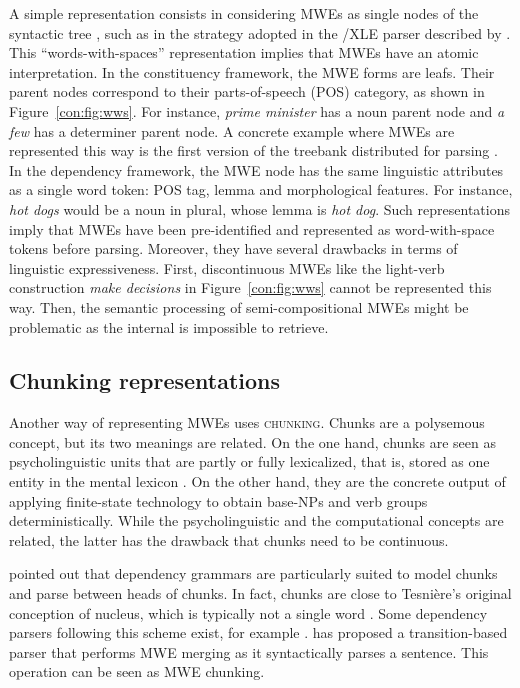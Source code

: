 \documentclass[output=paper]{langsci/langscibook}
\begin{document}
A simple representation consists in considering MWEs as single nodes of the syntactic tree \citep{sag02}, such as in the strategy adopted in the /XLE parser described by . This ``words-with-spaces'' representation implies that MWEs have an atomic interpretation. In the constituency framework, the MWE forms are leafs. Their parent nodes correspond to their parts-of-speech (POS) category, as shown in Figure~\ref{con:fig:wws}. For instance, \textit{prime minister} has a noun parent node and \textit{a few} has a determiner parent node. 
A concrete example where MWEs are represented this way is the first version of the  treebank distributed for parsing \citep{candito:2009}. 
In the dependency framework, the MWE node has the same linguistic attributes as a single word token: POS tag, lemma and morphological features. For instance, \textit{hot dogs} would be a noun in plural, whose lemma is \textit{hot dog}. Such representations imply that MWEs have been pre-identified and represented as word-with-space tokens before parsing. Moreover, they have several drawbacks in terms of linguistic expressiveness. First, discontinuous MWEs like the light-verb construction \textit{make decisions} in Figure~\ref{con:fig:wws} cannot be represented this way. Then, the semantic processing of semi-compositional MWEs might be problematic as the internal  is impossible to retrieve.%

\subsection {Chunking representations}
\label{con:ssec:chunking}

Another way of representing MWEs uses \textsc{chunking}. 
Chunks are a polysemous concept, but its two meanings are related. 
On the one hand, chunks are seen as psycholinguistic units that are partly or fully lexicalized, that is, stored as one entity in the mental lexicon \citep{miller56,pawley-syder83,tomasello98,wray08}. 
On the other hand, they are 
the concrete output of applying finite-state technology to obtain base-NPs and verb groups deterministically. While the psycholinguistic and the computational concepts are related, the latter has the drawback that chunks need to be continuous.

\citet{abney1991procedure} pointed out that dependency grammars are particularly suit\-ed to model chunks and parse between heads of chunks. 
In fact, chunks are close to Tesnière's original conception of nucleus, which is typically not a single word \citep{tesniere:1959}. Some dependency parsers following this scheme exist, for example \citet{schneiderphd}. \citet{nivre:2014} has proposed a transition-based parser that performs MWE merging as it syntactically parses a sentence. This operation can be seen as MWE chunking. 
\end{document}
